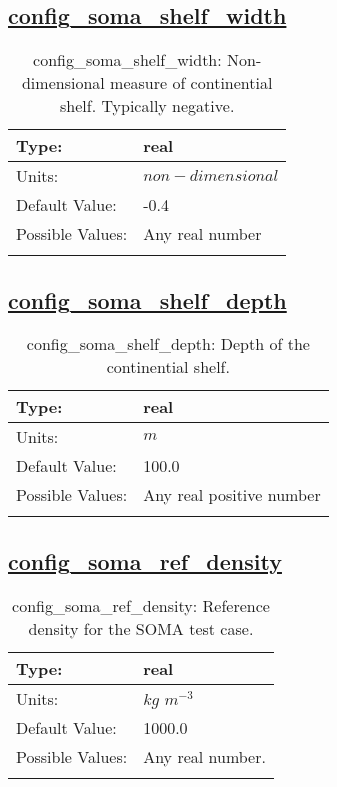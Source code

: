 \subsection[config\_soma\_shelf\_width]{\hyperref[sec:nm_tab_soma]{config\_soma\_shelf\_width}}
\label{subsec:nm_sec_config_soma_shelf_width}
\begin{center}
\begin{longtable}{| p{2.0in} || p{4.0in} |}
    \hline
    Type: & real \\
    \hline
    Units: & $non-dimensional$ \\
    \hline
    Default Value: & -0.4 \\
    \hline
    Possible Values: & Any real number \\
    \hline
    \caption{config\_soma\_shelf\_width: Non-dimensional measure of continential shelf. Typically negative.}
\end{longtable}
\end{center}
\subsection[config\_soma\_shelf\_depth]{\hyperref[sec:nm_tab_soma]{config\_soma\_shelf\_depth}}
\label{subsec:nm_sec_config_soma_shelf_depth}
\begin{center}
\begin{longtable}{| p{2.0in} || p{4.0in} |}
    \hline
    Type: & real \\
    \hline
    Units: & $m$ \\
    \hline
    Default Value: & 100.0 \\
    \hline
    Possible Values: & Any real positive number \\
    \hline
    \caption{config\_soma\_shelf\_depth: Depth of the continential shelf.}
\end{longtable}
\end{center}
\subsection[config\_soma\_ref\_density]{\hyperref[sec:nm_tab_soma]{config\_soma\_ref\_density}}
\label{subsec:nm_sec_config_soma_ref_density}
\begin{center}
\begin{longtable}{| p{2.0in} || p{4.0in} |}
    \hline
    Type: & real \\
    \hline
    Units: & $kg$ $m^{-3}$ \\
    \hline
    Default Value: & 1000.0 \\
    \hline
    Possible Values: & Any real number. \\
    \hline
    \caption{config\_soma\_ref\_density: Reference density for the SOMA test case.}
\end{longtable}
\end{center}
